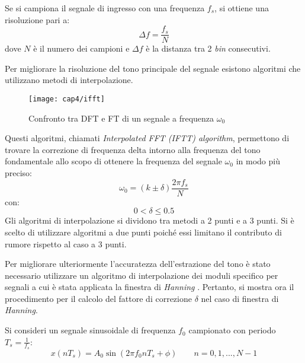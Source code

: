 Se si campiona il segnale di ingresso con una frequenza $f_s$, si ottiene una risoluzione pari a:
\begin{equation}
	\Delta f = \frac{f_s}{N}
	\label{deltaf}
\end{equation}
dove $N$ è il numero dei campioni e $\Delta f$ è la distanza tra 2 \textit{bin} consecutivi.

Per migliorare la risoluzione del tono principale del segnale esistono algoritmi che utilizzano metodi di interpolazione.
\begin{figure}  
  \begin{center}
    \texttt{[image: cap4/ifft]}
    \caption{Confronto tra DFT e FT di un segnale a frequenza $\omega _0$}
    \label{ifft}
  \end{center}
\end{figure}

Questi algoritmi, chiamati \textit{Interpolated FFT (IFTT) algorithm}, permettono di trovare la correzione di frequenza delta intorno alla frequenza del tono fondamentale allo scopo di ottenere la frequenza del segnale $\omega _0$  in modo più preciso:	
\begin{equation}
	\omega _0 = (k \pm \delta)\frac{2 \pi f_s}{N}
\end{equation}
con:
$$ 0 < \delta \leq 0.5$$
Gli algoritmi di interpolazione si dividono tra metodi a 2 punti e a 3 punti. Si è scelto di utilizzare algoritmi a due punti poiché essi limitano il contributo di rumore rispetto al caso a 3 punti. 

Per migliorare ulteriormente l'accuratezza dell'estrazione del tono è stato necessario utilizzare un algoritmo di interpolazione dei moduli specifico per segnali a cui è stata applicata la finestra di \textit{Hanning} \cite{1007077}. Pertanto, si mostra ora il procedimento per il calcolo del fattore di correzione $\delta$ nel caso di finestra di \textit{Hanning}.

Si consideri un segnale sinusoidale di frequenza $f_0$ campionato con periodo $T_s=\frac{1}{f_s}$:
\begin{equation}
	x(nT_s)=A_0 \sin ( 2 \pi f_0 n T_s + \phi ) \qquad n=0,1,...,N-1
	\label{xcampionato}
\end{equation}

